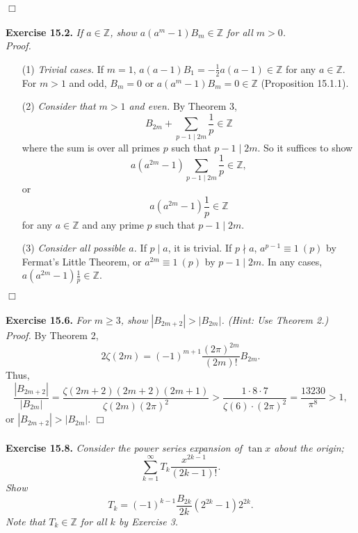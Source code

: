 \documentclass{article}
\begin{document}
$\Box$\\\\



\textbf{Exercise 15.2.}
\emph{If $a \in \mathbb{Z}$,
show $a(a^m - 1)B_m \in \mathbb{Z}$ for all $m > 0$.} \\

\emph{Proof.}
\begin{enumerate}
\item[(1)] \emph{Trivial cases.}
If $m = 1$, $a(a - 1) B_1 = -\frac{1}{2} a(a - 1) \in \mathbb{Z}$ for any $a \in \mathbb{Z}$.
For $m > 1$ and odd, $B_m = 0$ or $a(a^m - 1)B_m = 0 \in \mathbb{Z}$ (Proposition 15.1.1). \\
\item[(2)] \emph{Consider that $m > 1$ and even.}
By Theorem 3,
$$B_{2m} + \sum_{p-1 \mid 2m} \frac{1}{p} \in \mathbb{Z}$$
where the sum is over all primes $p$ such that $p-1 \mid 2m$.
So it suffices to show
$$a(a^{2m} - 1) \sum_{p-1 \mid 2m} \frac{1}{p} \in \mathbb{Z}, $$
or
$$a(a^{2m} - 1) \frac{1}{p} \in \mathbb{Z}$$
for any $a \in \mathbb{Z}$ and any prime $p$ such that $p-1 \mid 2m$.
\item[(3)] \emph{Consider all possible $a$.}
If $p \mid a$, it is trivial.
If $p \nmid a$, $a^{p - 1} \equiv 1 \: (p)$ by Fermat's Little Theorem,
or $a^{2m} \equiv 1 \: (p)$ by $p-1 \mid 2m$.
In any cases, $a(a^{2m} - 1)\frac{1}{p} \in \mathbb{Z}$.
\end{enumerate}
$\Box$ \\\\



\textbf{Exercise 15.6.}
\emph{For $m \geq 3$, show $|B_{2m+2}| > |B_{2m}|$. (Hint: Use Theorem 2.)} \\

\emph{Proof.}
By Theorem 2,
$$2 \zeta(2m) = (-1)^{m+1} \frac{(2\pi)^{2m}}{(2m)!} B_{2m}.$$
Thus,
$$\frac{|B_{2m+2}|}{|B_{2m}|}
= \frac{\zeta(2m+2)(2m+2)(2m+1)}{\zeta(2m)(2\pi)^2}
> \frac{1 \cdot 8 \cdot 7}{\zeta(6) \cdot (2\pi)^2}
= \frac{13230}{\pi^8}
> 1,$$
or $|B_{2m+2}| > |B_{2m}|$.
$\Box$ \\\\



\textbf{Exercise 15.8.}
\emph{Consider the power series expansion of $\tan x$ about the origin;
$$\sum_{k=1}^{\infty} T_k \frac{x^{2k - 1}}{(2k - 1)!}.$$
Show $$T_k = (-1)^{k-1} \frac{B_{2k}}{2k} (2^{2k} - 1) 2^{2k}.$$
Note that $T_k \in \mathbb{Z}$ for all $k$ by Exercise 3.} \\
\end{document}
